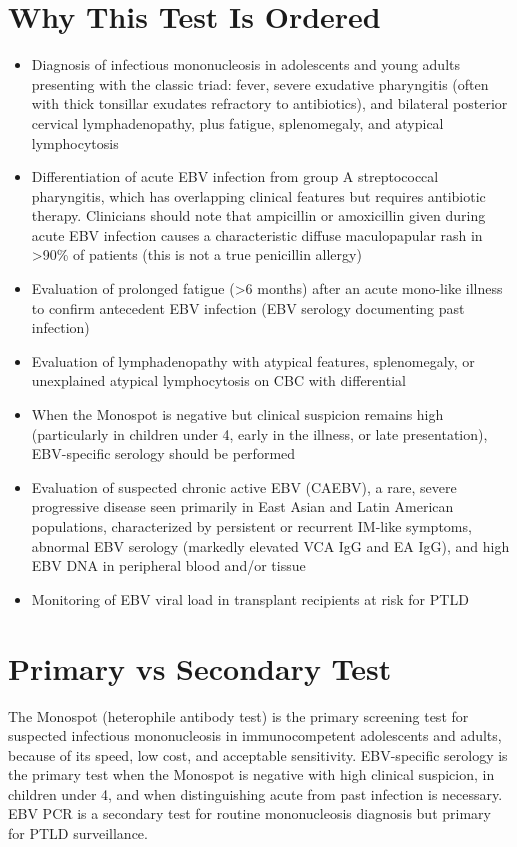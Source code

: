 \section*{Why This Test Is Ordered}
\begin{itemize}
  \item Diagnosis of infectious mononucleosis in adolescents and young adults presenting with the classic triad: fever, severe exudative pharyngitis (often with thick tonsillar exudates refractory to antibiotics), and bilateral posterior cervical lymphadenopathy, plus fatigue, splenomegaly, and atypical lymphocytosis
  \item Differentiation of acute EBV infection from group A streptococcal pharyngitis, which has overlapping clinical features but requires antibiotic therapy. Clinicians should note that ampicillin or amoxicillin given during acute EBV infection causes a characteristic diffuse maculopapular rash in >90\% of patients (this is not a true penicillin allergy)
  \item Evaluation of prolonged fatigue (\textgreater 6 months) after an acute mono-like illness to confirm antecedent EBV infection (EBV serology documenting past infection)
  \item Evaluation of lymphadenopathy with atypical features, splenomegaly, or unexplained atypical lymphocytosis on CBC with differential
  \item When the Monospot is negative but clinical suspicion remains high (particularly in children under 4, early in the illness, or late presentation), EBV-specific serology should be performed
  \item Evaluation of suspected chronic active EBV (CAEBV), a rare, severe progressive disease seen primarily in East Asian and Latin American populations, characterized by persistent or recurrent IM-like symptoms, abnormal EBV serology (markedly elevated VCA IgG and EA IgG), and high EBV DNA in peripheral blood and/or tissue
  \item Monitoring of EBV viral load in transplant recipients at risk for PTLD
\end{itemize}

\section*{Primary vs Secondary Test}
The Monospot (heterophile antibody test) is the primary screening test for suspected infectious mononucleosis in immunocompetent adolescents and adults, because of its speed, low cost, and acceptable sensitivity. EBV-specific serology is the primary test when the Monospot is negative with high clinical suspicion, in children under 4, and when distinguishing acute from past infection is necessary. EBV PCR is a secondary test for routine mononucleosis diagnosis but primary for PTLD surveillance.

